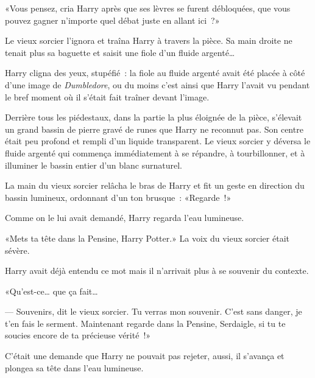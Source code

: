«Vous pensez, cria Harry après que ses lèvres se furent débloquées, que vous pouvez gagner n'importe quel débat juste en allant ici~?»

Le vieux sorcier l'ignora et traîna Harry à travers la pièce. Sa main droite ne tenait plus sa baguette et saisit une fiole d'un fluide argenté…

Harry cligna des yeux, stupéfié~: la fiole au fluide argenté avait été placée à côté d'une image de \emph{Dumbledore}, ou du moins c'est ainsi que Harry l'avait vu pendant le bref moment où il s'était fait traîner devant l'image.

Derrière tous les piédestaux, dans la partie la plus éloignée de la pièce, s'élevait un grand bassin de pierre gravé de runes que Harry ne reconnut pas. Son centre était peu profond et rempli d'un liquide transparent. Le vieux sorcier y déversa le fluide argenté qui commença immédiatement à se répandre, à tourbillonner, et à illuminer le bassin entier d'un blanc surnaturel.

La main du vieux sorcier relâcha le bras de Harry et fit un geste en direction du bassin lumineux, ordonnant d'un ton brusque~: «Regarde~!»

Comme on le lui avait demandé, Harry regarda l'eau lumineuse.

«Mets ta tête dans la Pensine, Harry Potter.» La voix du vieux sorcier était sévère.

Harry avait déjà entendu ce mot mais il n'arrivait plus à se souvenir du contexte.

«Qu'est-ce… que ça fait…

--- Souvenirs, dit le vieux sorcier. Tu verras mon souvenir. C'est sans danger, je t'en fais le serment. Maintenant regarde dans la Pensine, Serdaigle, si tu te soucies encore de ta précieuse vérité~!»

C'était une demande que Harry ne pouvait pas rejeter, aussi, il s'avança et plongea sa tête dans l'eau lumineuse.
\later

